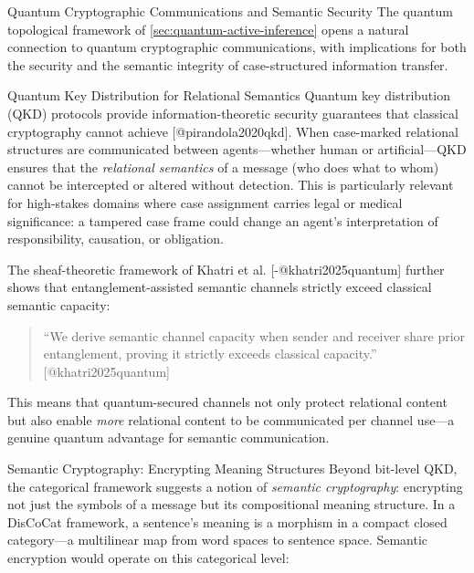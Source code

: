 \documentclass[
  ignorenonframetext,
]{beamer}
\begin{document}
\begin{frame}{Quantum Cryptographic Communications and Semantic
Security}
\protect{}\label{quantum-cryptographic-communications-and-semantic-security}
The quantum topological framework of
\autoref{sec:quantum-active-inference} opens a natural connection to
quantum cryptographic communications, with implications for both the
security and the semantic integrity of case-structured information
transfer.

\begin{block}{Quantum Key Distribution for Relational Semantics}
\protect{}\label{quantum-key-distribution-for-relational-semantics}
Quantum key distribution (QKD) protocols provide information-theoretic
security guarantees that classical cryptography cannot achieve
{[}@pirandola2020qkd{]}. When case-marked relational structures are
communicated between agents---whether human or artificial---QKD ensures
that the \emph{relational semantics} of a message (who does what to
whom) cannot be intercepted or altered without detection. This is
particularly relevant for high-stakes domains where case assignment
carries legal or medical significance: a tampered case frame could
change an agent's interpretation of responsibility, causation, or
obligation.

The sheaf-theoretic framework of Khatri et al. {[}-@khatri2025quantum{]}
further shows that entanglement-assisted semantic channels strictly
exceed classical semantic capacity:

\begin{quote}
``We derive semantic channel capacity when sender and receiver share
prior entanglement, proving it strictly exceeds classical capacity.''
{[}@khatri2025quantum{]}
\end{quote}

This means that quantum-secured channels not only protect relational
content but also enable \emph{more} relational content to be
communicated per channel use---a genuine quantum advantage for semantic
communication.
\end{block}

\begin{block}{Semantic Cryptography: Encrypting Meaning Structures}
\protect{}\label{semantic-cryptography-encrypting-meaning-structures}
Beyond bit-level QKD, the categorical framework suggests a notion of
\emph{semantic cryptography}: encrypting not just the symbols of a
message but its compositional meaning structure. In a DisCoCat
framework, a sentence's meaning is a morphism in a compact closed
category---a multilinear map from word spaces to sentence space.
Semantic encryption would operate on this categorical level:


\end{block}
\end{frame}
\end{document}
